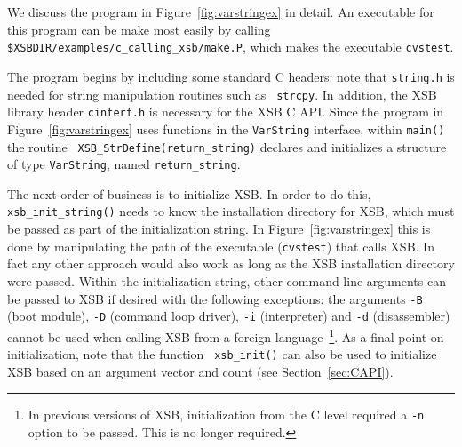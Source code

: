 We discuss the program in Figure~\ref{fig:varstringex} in detail.
An executable for this program can be make most easily by calling {\tt
  \$XSBDIR/examples/c\_calling\_xsb/make.P}, which makes the
executable {\tt cvstest}.

The program begins by including some standard C headers: note that
{\tt string.h} is needed for string manipulation routines such as {\tt
  strcpy}.  In addition, the XSB library header {\tt cinterf.h} is
necessary for the XSB C API.  Since the program in
Figure~\ref{fig:varstringex} uses functions in the {\tt VarString}
interface, within {\tt main()} the routine {\tt
  XSB\_StrDefine(return\_string)} declares and initializes a structure
of type {\tt VarString}, named {\tt return\_string}.

The next order of business is to initialize XSB.  In order to do this,
{\tt xsb\_init\_string()} needs to know the installation directory for
XSB, which must be passed as part of the initialization string.  In
Figure~\ref{fig:varstringex} this is done by manipulating the path of
the executable ({\tt cvstest}) that calls XSB.  In fact any other
approach would also work as long as the XSB installation directory
were passed.  Within the initialization string, other command line
arguments can be passed to XSB if desired with the following
exceptions: the arguments {\tt -B} (boot module), {\tt -D} (command
loop driver), {\tt -i} (interpreter) and {\tt -d} (disassembler)
cannot be used when calling XSB from a foreign language~\footnote{In
  previous versions of XSB, initialization from the C level required a
  {\tt -n} option to be passed.  This is no longer required.}.  As a
final point on initialization, note that the function {\tt
  xsb\_init()} can also be used to initialize XSB based on an argument
vector and count (see Section~\ref{sec:CAPI}).

